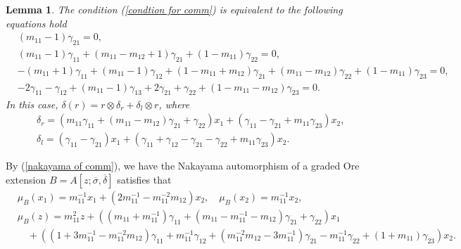 \documentclass[a4paper,10pt]{amsart}
\newtheorem{lemma}[theorem]{Lemma}
\theoremstyle{definition}
\numberwithin{equation}{section}
\begin{document}
\begin{lemma}
The condition (\ref{condtion for comm}) is equivalent to the following equations hold
\begin{equation}\label{equation for Jordan}
\begin{aligned}
&(m_{11}-1)\gamma_{21}=0,\\
&(m_{11}-1)\gamma_{11}+(m_{11}-m_{12}+1)\gamma_{21}+(1-m_{11})\gamma_{22}=0,\\
&-(m_{11}+1)\gamma_{11}+(m_{11}-1)\gamma_{12}+(1-m_{11}+m_{12})\gamma_{21}+(m_{11}-m_{12})\gamma_{22}+(1-m_{11})\gamma_{23}=0,\\
&-2\gamma_{11}-\gamma_{12}+(m_{11}-1)\gamma_{13}+2\gamma_{21}+\gamma_{22}+(1-m_{11}-m_{12})\gamma_{23}=0.
\end{aligned}
\end{equation}
In this case, $\delta(r)=r\otimes \delta_r+\delta_l\otimes r$, where
\begin{eqnarray*}
&&\delta_{r}=(m_{11}\gamma_{11}+(m_{11}-m_{12})\gamma_{21}+\gamma_{22})x_1+(\gamma_{11}-\gamma_{21}+m_{11}\gamma_{23})x_2,\\
&&\delta_{l}=(\gamma_{11}-\gamma_{21})x_1+(\gamma_{11}+\gamma_{12}-\gamma_{21}-\gamma_{22}+m_{11}\gamma_{23})x_2.
\end{eqnarray*}
\end{lemma}
By (\ref{nakayama of comm}), we have the Nakayama automorphism of a graded Ore extension $B=A[z;\overline{\sigma},\overline{\delta}]$ satisfies that
 \begin{equation}\label{naka equa for jordan}
 \begin{aligned}
    &\mu_B(x_1)=m_{11}^{-1}x_1+(2m_{11}^{-1}-m_{11}^{-2}m_{12})x_2,\quad \mu_B(x_2)=m_{11}^{-1}x_2,\\
    &\mu_B(z)=m_{11}^2z+
    ((m_{11}+m_{11}^{-1})\gamma_{11}+(m_{11}-m_{11}^{-1}-m_{12})\gamma_{21}+\gamma_{22})x_1\\
    &\quad+((1+3m_{11}^{-1}-m_{11}^{-2}m_{12})\gamma_{11}+m_{11}^{-1}\gamma_{12}+(m_{11}^{-2}m_{12}-3m_{11}^{-1})\gamma_{21}-m_{11}^{-1}\gamma_{22}+(1+m_{11})\gamma_{23})x_2.
    \end{aligned}
\end{equation}
\end{document}
